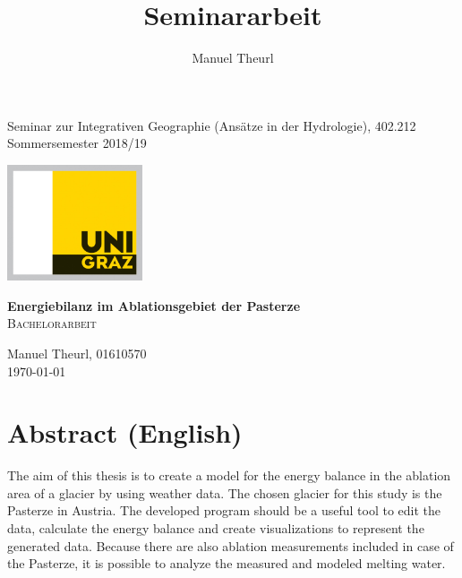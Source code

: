 \documentclass[12pt,a4paper]{article}
\title{Seminararbeit}
\author{Manuel Theurl}
\begin{document}

\begin{titlepage}

\begin{flushright}
\begin{normalsize}
Seminar zur Integrativen Geographie (Ansätze in der Hydrologie), 402.212
\\
Sommersemester 2018/19
\end{normalsize}
\end{flushright}

\vspace{5cm}

\begin{center}
\includegraphics[width=0.3\textwidth]{logo_uni_graz.jpg}

\vspace{1.5cm}

\textbf{\Large Energiebilanz im Ablationsgebiet der Pasterze}\\
\vspace{2cm}
\textsc{\large {Bachelorarbeit}}\\[4cm]
\end{center}

\vspace{2cm}

\begin{flushright}
Manuel Theurl, 01610570\\
\today
\end{flushright}

\end{titlepage} 

\pagebreak
\ofoot{{\small \pagemark}}
\section*{Abstract (English)}
The aim of this thesis is to create a model for the energy balance in the ablation area of a glacier by using weather data. The chosen glacier for this study is the Pasterze in Austria. The developed program should be a useful tool to edit the data, calculate the energy balance and create visualizations to represent the generated data. Because there are also ablation measurements included in case of the Pasterze, it is possible to analyze the measured and modeled melting water.\\
\end{document}
